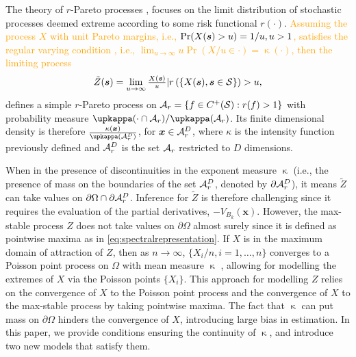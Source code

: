\documentclass[12pt]{article}
\newcommand{\PZ}{\textcolor{orange}}
\begin{document}
The theory of $r$-Pareto processes \citep{Dombry.Ribatet:2015, deFondeville.Davison:2022}, focuses on the limit distribution of stochastic processes deemed extreme according to some risk functional $r(\cdot)$.
\PZ{Assuming the process $X$ with unit Pareto margins, i.e., ${\rm Pr}(X({\boldsymbol{s}})>u)=1/u,u>1$, satisfies the regular varying condition \citep[see][]{Dombry.Ribatet:2015}, i.e., $\lim_{u\to\infty}u\Pr(X/u \in \cdot)=\upkappa(\cdot)$,
then the limiting process}
\begin{align}
\label{eq:rpp}    
\tilde{Z}({\boldsymbol{s}}) = \lim_{u\rightarrow \infty} {\textstyle{X({\boldsymbol{s}})\over u}}  \vert r\left(\{X({\boldsymbol{s}}),{\boldsymbol{s}}\in{\mathcal{S}}\} \right) >u,
\end{align}
%
defines a simple $r$-Pareto process on ${\mathcal A}_r = \left\{ f \in C^+({\mathcal{S}}): r(f) > 1\right\}$ with probability measure $\upkappa(\cdot \cap \calA_r)/ \upkappa(\calA_r)$. 
Its finite dimensional density is therefore
%
$\frac{\kappa(\bx)}{\upkappa(\calA_r^D)}$, for ${\boldsymbol{x}} \in {\mathcal A}_r^D$,
%
where $\kappa$ is the intensity function previously defined and ${\mathcal A}_r^D$ is the set ${\mathcal A}_r$ restricted to $D$ dimensions. 

When in the presence of discontinuities in the exponent measure $\upkappa$ (i.e., the presence of mass on the boundaries of the set ${\mathcal A}_r^D$, denoted by $\partial{\mathcal A}_r^D$), it means $\tilde Z$ can take values on $\partial\Omega \cap \partial{\mathcal A}_r^D$. Inference for $\tilde Z$ is therefore challenging since it requires the evaluation of the partial derivatives, $-V_{B_k}(\bm x)$. 
However, the max-stable process $Z$ does not take values on $\partial\Omega$ almost surely since it is defined as pointwise maxima as in \eqref{eq:spectralrepresentation}. If $X$ is in the maximum domain of attraction of $Z$, then as $n\to\infty$, $\{X_i/n,i=1,\dots,n\}$ converges to a Poisson point process on $\Omega$ with mean measure $\upkappa$ \citep[Ch.~6]{Resnick:2006}, allowing for modelling the extremes of $X$ via the Poisson points $\{X_i\}$. This approach for modelling $Z$ relies on the convergence of $X$ to the Poisson point process and the convergence of $X$ to the max-stable process by taking pointwise maxima. The fact that $\upkappa$ can put mass on $\partial\Omega$ hinders the convergence of $X$, introducing large bias in estimation. In this paper, we provide conditions ensuring the continuity of $\upkappa$, and introduce two new models that satisfy them.
\end{document}
